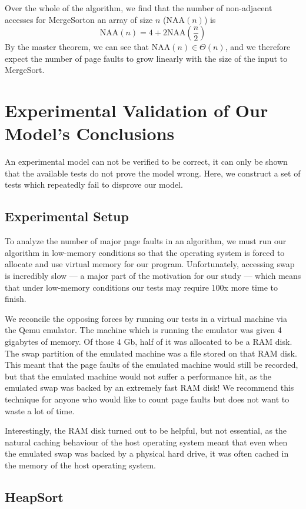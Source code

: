 \documentclass[11pt]{article}
\newcommand{\heapsort}{{\sc HeapSort}}
\newcommand{\mergesort}{{\sc MergeSort}}
\newcommand{\NAA}{\textrm{NAA}}
\begin{document}
Over the whole of the algorithm, we find that the number
of non-adjacent accesses for \mergesort on an array of size $n$ ($\NAA(n)$) is $$\NAA(n) = 4 + 2\NAA(\frac{n}{2})$$
By the master theorem, we can see that $\NAA(n) \in \Theta(n)$, and
we therefore expect the number of page faults to grow linearly with the
size of the input to \mergesort.

\section{Experimental Validation of Our Model's Conclusions}

An experimental model can not be verified to be correct, it can only be shown
that the available tests do not prove the model wrong.  Here, we construct a
set of tests which repeatedly fail to disprove our model.

\subsection{Experimental Setup}

To analyze the number of major page faults in an algorithm, we must run our
algorithm in low-memory conditions so that the operating system is forced to
allocate and use virtual memory for our program.  Unfortunately, accessing swap
is incredibly slow --- a major part of the motivation for our study --- which
means that under low-memory conditions our tests may require 100x more time to
finish.  

We reconcile the opposing forces by running our tests in a virtual machine via
the Qemu emulator.  The machine which is running the emulator was given 4
gigabytes of memory.  Of those 4 Gb, half of it was allocated to be a RAM disk.
The swap partition of the emulated machine was a file stored on that RAM disk.
This meant that the page faults of the emulated machine would still be
recorded, but that the emulated machine would not suffer a performance hit, as
the emulated swap was backed by an extremely fast RAM disk!  We recommend this
technique for anyone who would like to count page faults but does not want to
waste a lot of time.

Interestingly, the RAM disk turned out to be helpful, but not essential, as the
natural caching behaviour of the host operating system meant that even when the
emulated swap was backed by a physical hard drive, it was often cached in the
memory of the host operating system.

\subsection{\heapsort}
\end{document}
